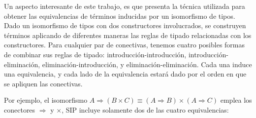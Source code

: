 Un aspecto interesante de este trabajo, es que presenta la técnica utilizada para obtener las equivalencias de términos inducidas por un isomorfismo de tipos.
Dado un isomorfismo de tipos con dos constructores involucrados, se construyen términos aplicando de diferentes maneras las reglas de tipado relacionadas con los constructores.
Para cualquier par de conectivas, tenemos cuatro posibles formas de combinar sus reglas de tipado: introducción-introducción, introducción-eliminación, eliminación-introducción, y eliminación-eliminación.
Cada una induce una equivalencia, y cada lado de la equivalencia estará dado por el orden en que se apliquen las conectivas.

Por ejemplo, el isomorfismo $A \Rightarrow (B \times C) \equiv (A \Rightarrow B) \times (A \Rightarrow C)$ emplea los conectores $\Rightarrow$ y $\times$, SIP incluye solamente dos de las cuatro equivalencias:

